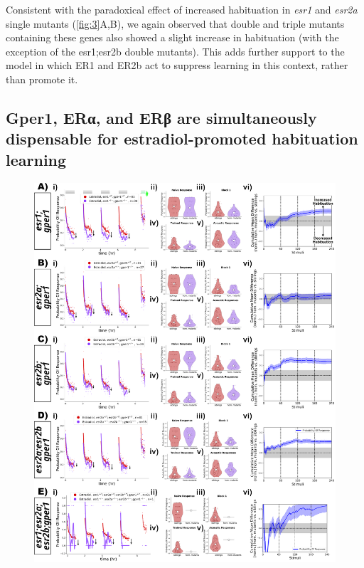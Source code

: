 \documentclass[9.5pt,lineno]{RandlettLab_elife}
\begin{document}
{Consistent with the paradoxical effect of increased habituation in \emph{esr1} and \emph{esr2a} single mutants (\autoref{fig:3}A,B), we again observed that double and triple mutants containing these genes also showed a slight increase in habituation (with the exception of the {esr1;esr2b} double mutants).
This adds further support to the model in which ER1 and ER2b act to suppress learning in this context, rather than promote it. 


\subsection{Gper1, ERα, and ERβ are simultaneously dispensable for estradiol-promoted habituation learning}

\begin{figure}
\begin{fullwidth}
\begin{center}
\includegraphics[width=0.70\linewidth]{figures/gper1andNuclearMutants.png}


\end{center}
\end{fullwidth}
\end{figure}}
\end{document}

